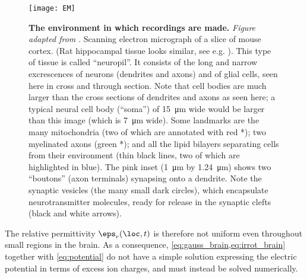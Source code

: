 %
%



\begin{figure}
\texttt{[image: EM]}
\caption{\textbf{The environment in which recordings are made.} \emph{Figure
adapted from \cite{Knott2008}}. Scanning electron micrograph of a slice of mouse cortex. (Rat hippocampal tissue looks similar, see e.g. \cite{Martin2017}). This type of tissue is called ``neuropil''. It consists of the long and narrow excrescences of neurons (dendrites and axons) and of glial cells, seen here in cross and through section. Note that cell bodies are much larger than the cross sections of dendrites and axons as seen here; a typical neural cell body (``soma'') of \SI{15}{\micro\metre} wide would be larger than this image (which is \SI{7}{\micro\metre} wide). Some landmarks are the many mitochondria (two of which are annotated with red *); two myelinated axons (green *); and all the lipid bilayers separating cells from their environment (thin black lines, two of which are highlighted in blue). The pink inset (\SI{1}{\micro\meter} by \SI{1.24}{\micro\meter}) shows two ``boutons'' (axon terminals) synapsing onto a dendrite. Note the synaptic vesicles (the many small dark circles), which encapsulate neurotransmitter molecules, ready for release in the synaptic clefts (black and white arrows).}
\label{fig:neuropil}
\end{figure}


The relative permittivity $\eps_r(\loc,t)$ is therefore not uniform even throughout small regions in the brain. As a consequence, \cref{eq:gauss_brain,eq:irrot_brain} together with \cref{eq:potential} do not have a simple solution expressing the electric potential in terms of excess ion charges, and must instead be solved numerically.

